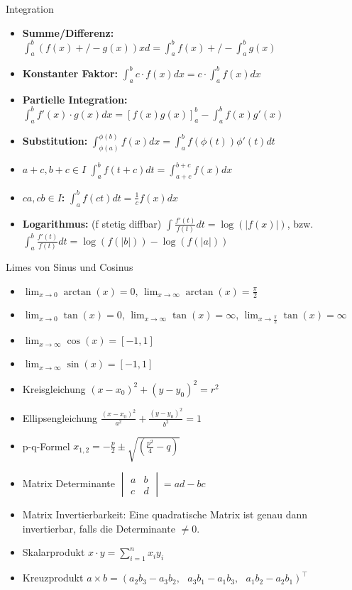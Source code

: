 \begin{Rechenregeln}{Integration}{}
    \begin{itemize}
    \item \textbf{Summe/Differenz:} $\int_a^b (f(x) +/- g(x)) xd = \int_a^b f(x) +/- \int_a^b g(x)$
    \item \textbf{Konstanter Faktor:} $\int_a^b c\cdot f(x)dx = c\cdot \int_a^b f(x)dx$
    \item \textbf{Partielle Integration:} $\int_a^b f'(x)\cdot g(x)dx = \left[f(x)g(x)\right]_a^b - \int_a^b f(x)g'(x)$
    \item \textbf{Substitution:} $\int_{\phi(a)}^{\phi(b)} f(x)dx = \int_a^b f(\phi(t))\phi '(t) dt$
    \item \textbf{$a+c, b+c \in I$} $\int_a^b f(t+c)dt = \int_{a+c}^{b+c} f(x)dx$
    \item \textbf{$ca,cb\in I$: } $\int_a^b f(ct)dt = \frac{1}{c}f(x)dx$
    \item \textbf{Logarithmus: }\;(f stetig diffbar) $\int\frac{f'(t)}{f(t)}dt = \log(|f(x)|)$, bzw. $\int_a^b\frac{f'(t)}{f(t)}dt = \log(f(|b|)) - \log(f(|a|))$
    \end{itemize}
\end{Rechenregeln}

\begin{Rechenregeln}{Limes von Sinus und Cosinus}{}
    \begin{itemize}
    \item $\lim_{x\to 0} \arctan(x) = 0$, $\lim_{x\to\infty} \arctan(x) = \frac{\pi}{2}$
    \item $\lim_{x\to 0} \tan(x) = 0$, $\lim_{x\to\infty} \tan(x) = \infty$, $\lim_{x\to\frac{\pi}{2}} \tan(x) = \infty$
    \item $\lim_{x\to\infty} \cos(x) = [-1, 1]$
    \item $\lim_{x\to\infty} \sin(x) = [-1, 1]$
    \end{itemize}
\end{Rechenregeln}

\begin{Diverses}{}{}
    \begin{itemize}
    \item Kreisgleichung $(x - x_0)^2 + (y - y_0)^2 = r^2$
    \item Ellipsengleichung $\frac{(x-x_0)^2}{a^2} + \frac{(y-y_0)^2}{b^2} = 1$
    \item p-q-Formel $x_{1, 2} = -\frac{p}{2} \pm \sqrt{\left(\frac{p^2}{4} - q\right)}$
    \item Matrix Determinante $\begin{vmatrix}
        a & b\\
        c & d
    \end{vmatrix} = ad-bc$
    \item Matrix Invertierbarkeit: Eine quadratische Matrix ist genau dann invertierbar, falls die Determinante $\neq 0$.
    \item Skalarprodukt $x \cdot y = \sum_{i=1}^n x_i y_i$
    \item Kreuzprodukt $a \times b = (a_2b_3-a_3b_2, ~~~ a_3b_1-a_1b_3, ~~~ a_1b_2-a_2b_1)^\top$
    \end{itemize}
\end{Diverses}


